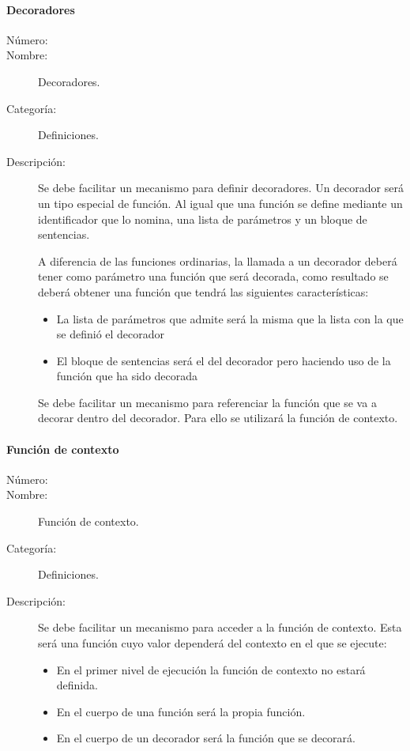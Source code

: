 \paragraph{Decoradores}
	\begin{description}
		\item [Número:] \cn
		\item [Nombre:] Decoradores.
		\item [Categoría:] Definiciones.
		\item [Descripción:] Se debe facilitar un mecanismo para definir decoradores. Un decorador será un tipo especial de función.
      Al igual que una función se define mediante un identificador que lo nomina, una lista de parámetros y un bloque de sentencias. 
      
      A diferencia de las funciones ordinarias, la llamada a un decorador deberá tener como parámetro una función que será decorada, como
      resultado se deberá obtener una función que tendrá las siguientes características:
      
      \begin{itemize}
         \item La lista de parámetros que admite será la misma que la lista con la que se definió el decorador
         \item El bloque de sentencias será el del decorador pero haciendo uso de la función que ha sido decorada
      \end{itemize}
      
      Se debe facilitar un mecanismo para referenciar la función que se va a decorar dentro del decorador. Para ello
      se utilizará la función de contexto.
	\end{description}

\paragraph{Función de contexto}
	\begin{description}
		\item [Número:] \cn
		\item [Nombre:] Función de contexto.
		\item [Categoría:] Definiciones.
		\item [Descripción:] Se debe facilitar un mecanismo para acceder a la función de contexto. Esta será una función 
      cuyo valor dependerá del contexto en el que se ejecute:
      \begin{itemize}
         \item En el primer nivel de ejecución la función de contexto no estará definida. 
         \item En el cuerpo de una función será la propia función.  
         \item En el cuerpo de un decorador será la función que se decorará.
      \end{itemize}
	\end{description}



